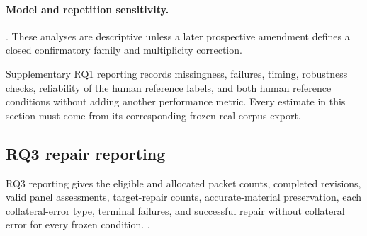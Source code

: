 \paragraph{Model and repetition sensitivity.}
. These analyses are descriptive unless a later prospective amendment defines a closed confirmatory family and multiplicity correction.

Supplementary RQ1 reporting records missingness, failures, timing, robustness checks, reliability of the human reference labels, and both human reference conditions without adding another performance metric. Every estimate in this section must come from its corresponding frozen real-corpus export.

\subsection{RQ3 repair reporting}

RQ3 reporting gives the eligible and allocated packet counts, completed revisions, valid panel assessments, target-repair counts, accurate-material preservation, each collateral-error type, terminal failures, and successful repair without collateral error for every frozen condition. .
